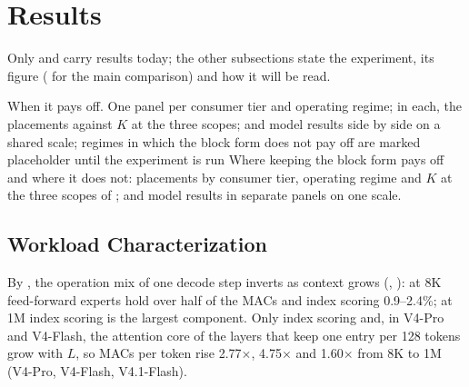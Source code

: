 
\section{Results}\label{sec:results}

%
Only  and  carry results today; the other subsections state the experiment, its figure ( for the main comparison) and how it will be read.

%
  {When it pays off. One panel per consumer tier and operating regime; in each, the placements against $K$ at the three scopes; \evRTL and model results side by side on a shared scale; regimes in which the block form does not pay off are marked}%
  {placeholder until the experiment is run}%
  {Where keeping the block form pays off and where it does not: placements by consumer tier, operating regime and $K$ at the three scopes of ; \evRTL and model results in separate panels on one scale.}

\subsection{Workload Characterization}\label{sec:res-workload}

%
By \evAnalytic, the operation mix of one decode step inverts as context grows (, ): at 8K feed-forward experts hold over half of the MACs and index scoring 0.9--2.4\%; at 1M index scoring is the largest component.
Only index scoring and, in V4-Pro and V4-Flash, the attention core of the layers that keep one entry per 128 tokens grow with $L$, so MACs per token rise 2.77$\times$, 4.75$\times$ and 1.60$\times$ from 8K to 1M (V4-Pro, V4-Flash, V4.1-Flash).

